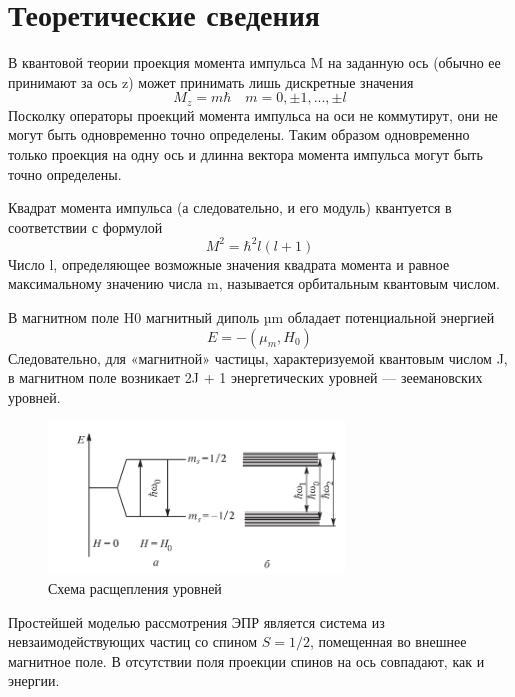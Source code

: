 \documentclass[a4paper,12pt]{article} %
\begin{document}
  \section{Теоретические сведения}
    В квантовой теории проекция момента импульса M на заданную ось (обычно ее принимают за ось z) может принимать лишь дискретные значения
    \begin{equation}
      M_z = m \hbar \quad
      m = 0, \pm 1, ... , \pm l
    \end{equation}
    Посколку операторы проекций момента импульса на оси не коммутирут, они не могут быть одновременно точно определены.
    Таким образом одновременно только проекция на одну ось и длинна вектора момента импульса могут быть точно определены.\par
    Квадрат момента импульса (а следовательно, и его модуль) квантуется в соответствии с формулой
    \begin{equation}
      M^2 = \hbar^2 l(l + 1)
    \end{equation}
    Число l, определяющее возможные значения квадрата момента и равное максимальному значению числа m, называется орбитальным квантовым числом.\par
    В магнитном поле H0 магнитный диполь µm обладает потенциальной энергией
    \begin{equation}
      E = - (\mu_m, H_0)
    \end{equation}
    Следовательно, для «магнитной» частицы, характеризуемой квантовым числом J, в магнитном поле возникает 2J + 1 энергетических уровней — зеемановских уровней.
    \begin{figure}[h!]
      \includegraphics[width=0.7\textwidth]{img/Levels.png}
      \centering
      \caption{Схема расщепления уровней}
    \end{figure}\par
  \newpage 
    Простейшей моделью рассмотрения ЭПР является система из невзаимодействующих частиц со спином $S = 1/2$, помещенная во внешнее магнитное поле. 
    В отсутствии поля проекции спинов на ось совпадают, как и энергии. 
\end{document}
